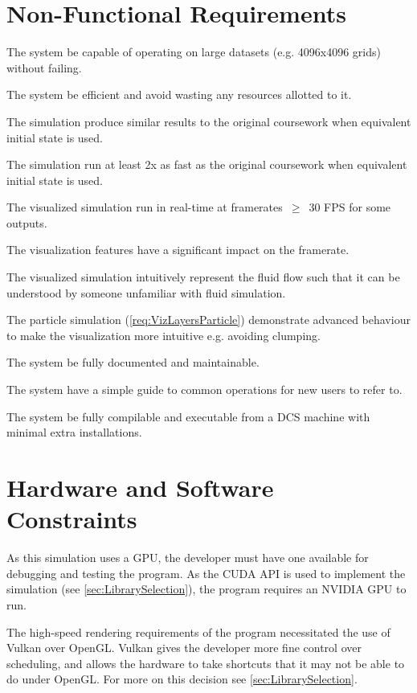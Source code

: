 \pagebreak
\section{Non-Functional Requirements}
\begin{reqNF}
    \item \label{reqN:LargeData} The system \must{} be capable of operating on large datasets (e.g. 4096x4096 grids) without failing.
    \item \label{reqN:Resources} The system \must{} be efficient and avoid wasting any resources allotted to it.
    \item \label{reqN:SimilarOutput} The simulation \must{} produce similar results to the original coursework when equivalent initial state is used.
    \item \label{reqN:SimSpeed} The simulation \should{} run at least 2x as fast as the original coursework when equivalent initial state is used.
    \item \label{reqN:Realtime} The visualized simulation \must{} run in real-time at framerates~$\ge$~30 FPS for some outputs.
    \item \label{reqN:VizSpeed} The visualization features \shouldnt{} have a significant impact on the framerate.
    \item \label{reqN:Intuitive} The visualized simulation \should{} intuitively represent the fluid flow such that it can be understood by someone unfamiliar with fluid simulation.
    \item \label{reqN:VizParticleAdvanced} The particle simulation (\cref{req:VizLayersParticle}) \should{} demonstrate advanced behaviour to make the visualization more intuitive e.g. avoiding clumping.
    \item \label{reqN:Documented} The system \must{} be fully documented and maintainable. %
    \item \label{reqN:UsageGuide} The system \should{} have a simple guide to common operations for new users to refer to.
    \item \label{reqN:DCSCompile} The system \should{} be fully compilable and executable from a DCS machine with minimal extra installations.
\end{reqNF}

\section{Hardware and Software Constraints}
\label{sec:Requirements_HardwareSoftware}
As this simulation uses a GPU, the developer must have one available for debugging and testing the program.
As the CUDA API is used to implement the simulation (see \cref{sec:LibrarySelection}), the program requires an NVIDIA GPU to run.

The high-speed rendering requirements of the program necessitated the use of Vulkan over OpenGL.
Vulkan gives the developer more fine control over scheduling, and allows the hardware to take shortcuts that it may not be able to do under OpenGL.
For more on this decision see \cref{sec:LibrarySelection}.
